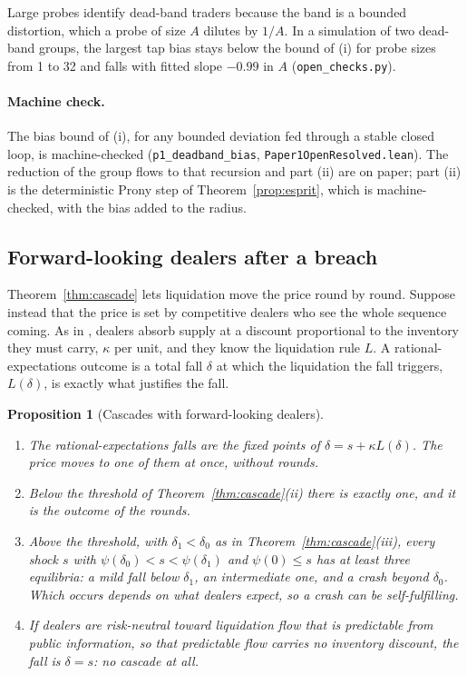 \documentclass[12pt]{article}
\newtheorem{proposition}[theorem]{Proposition}
\theoremstyle{definition}
\theoremstyle{remark}
\begin{document}
Large probes identify dead-band traders because the band is a bounded distortion, which a probe of size $A$ dilutes by $1/A$. In a simulation of two dead-band groups, the largest tap bias stays below the bound of (i) for probe sizes from 1 to 32 and falls with fitted slope $-0.99$ in $A$ (\nolinkurl{open_checks.py}).

\paragraph{Machine check.} The bias bound of (i), for any bounded deviation fed through a stable closed loop, is machine-checked (\texttt{p1\_deadband\_bias}, \nolinkurl{Paper1OpenResolved.lean}). The reduction of the group flows to that recursion and part (ii) are on paper; part (ii) is the deterministic Prony step of Theorem~\ref{prop:esprit}, which is machine-checked, with the bias added to the radius.

\subsection{Forward-looking dealers after a breach}

Theorem~\ref{thm:cascade} lets liquidation move the price round by round. Suppose instead that the price is set by competitive dealers who see the whole sequence coming. As in \citet{grossman1988}, dealers absorb supply at a discount proportional to the inventory they must carry, $\kappa$ per unit, and they know the liquidation rule $L$. A rational-expectations outcome is a total fall $\delta$ at which the liquidation the fall triggers, $L(\delta)$, is exactly what justifies the fall.

\begin{proposition}[Cascades with forward-looking dealers]\label{prop:reecascade}
\begin{enumerate}[label=(\roman*),itemsep=1pt]
\item The rational-expectations falls are the fixed points of $\delta=s+\kappa L(\delta)$. The price moves to one of them at once, without rounds.
\item Below the threshold of Theorem~\ref{thm:cascade}(ii) there is exactly one, and it is the outcome of the rounds.
\item Above the threshold, with $\delta_1<\delta_0$ as in Theorem~\ref{thm:cascade}(iii), every shock $s$ with $\psi(\delta_0)<s<\psi(\delta_1)$ and $\psi(0)\le s$ has at least three equilibria: a mild fall below $\delta_1$, an intermediate one, and a crash beyond $\delta_0$. Which occurs depends on what dealers expect, so a crash can be self-fulfilling.
\item If dealers are risk-neutral toward liquidation flow that is predictable from public information, so that predictable flow carries no inventory discount, the fall is $\delta=s$: no cascade at all.
\end{enumerate}
\end{proposition}
\end{document}
